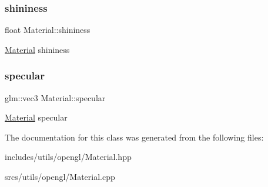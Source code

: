 \subsubsection{\texorpdfstring{shininess}{shininess}}
{\footnotesize\ttfamily float Material\+::shininess}

\hyperlink{class_material}{Material} shininess \mbox{\label{class_material_aac1c499923ff99564cdd97a4b5e504a9}} 
\subsubsection{\texorpdfstring{specular}{specular}}
{\footnotesize\ttfamily glm\+::vec3 Material\+::specular}

\hyperlink{class_material}{Material} specular 

The documentation for this class was generated from the following files\+:\begin{DoxyCompactItemize}
\item 
includes/utils/opengl/Material.\+hpp\item 
srcs/utils/opengl/Material.\+cpp\end{DoxyCompactItemize}
